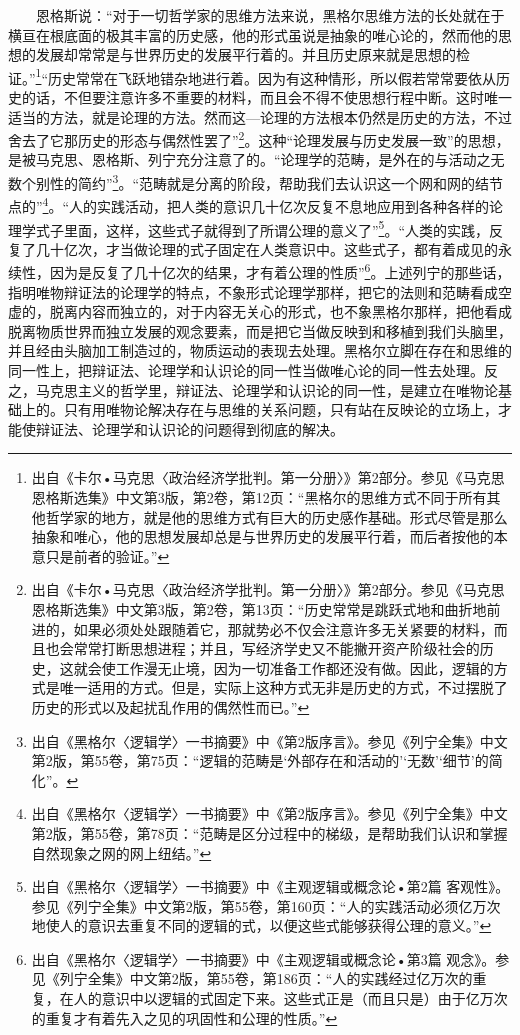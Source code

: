 \documentclass[cn,11pt,chinese]{elegantbook}
\begin{document}
　　恩格斯说：“对于一切哲学家的思维方法来说，黑格尔思维方法的长处就在于横亘在根底面的极其丰富的历史感，他的形式虽说是抽象的唯心论的，然而他的思想的发展却常常是与世界历史的发展平行着的。并且历史原来就是思想的检证。”\footnote[6]{ 出自《卡尔•马克思〈政治经济学批判。第一分册〉》第2部分。参见《马克思恩格斯选集》中文第3版，第2卷，第12页：“黑格尔的思维方式不同于所有其他哲学家的地方，就是他的思维方式有巨大的历史感作基础。形式尽管是那么抽象和唯心，他的思想发展却总是与世界历史的发展平行着，而后者按他的本意只是前者的验证。”}“历史常常在飞跃地错杂地进行着。因为有这种情形，所以假若常常要依从历史的话，不但要注意许多不重要的材料，而且会不得不使思想行程中断。这时唯一适当的方法，就是论理的方法。然而这—论理的方法根本仍然是历史的方法，不过舍去了它那历史的形态与偶然性罢了”\footnote[7]{ 出自《卡尔•马克思〈政治经济学批判。第一分册〉》第2部分。参见《马克思恩格斯选集》中文第3版，第2卷，第13页：“历史常常是跳跃式地和曲折地前进的，如果必须处处跟随着它，那就势必不仅会注意许多无关紧要的材料，而且也会常常打断思想进程；并且，写经济学史又不能撇开资产阶级社会的历史，这就会使工作漫无止境，因为一切准备工作都还没有做。因此，逻辑的方式是唯一适用的方式。但是，实际上这种方式无非是历史的方式，不过摆脱了历史的形式以及起扰乱作用的偶然性而已。”}。这种“论理发展与历史发展一致”的思想，是被马克思、恩格斯、列宁充分注意了的。“论理学的范畴，是外在的与活动之无数个别性的简约”\footnote[8]{ 出自《黑格尔〈逻辑学〉一书摘要》中《第2版序言》。参见《列宁全集》中文第2版，第55卷，第75页：“逻辑的范畴是‘外部存在和活动的’‘无数’‘细节’的简化”。}。“范畴就是分离的阶段，帮助我们去认识这一个网和网的结节点的”\footnote[9]{ 出自《黑格尔〈逻辑学〉一书摘要》中《第2版序言》。参见《列宁全集》中文第2版，第55卷，第78页：“范畴是区分过程中的梯级，是帮助我们认识和掌握自然现象之网的网上纽结。”}。“人的实践活动，把人类的意识几十亿次反复不息地应用到各种各样的论理学式子里面，这样，这些式子就得到了所谓公理的意义了”\footnote[10]{ 出自《黑格尔〈逻辑学〉一书摘要》中《主观逻辑或概念论•第2篇 客观性》。参见《列宁全集》中文第2版，第55卷，第160页：“人的实践活动必须亿万次地使人的意识去重复不同的逻辑的式，以便这些式能够获得公理的意义。”}。“人类的实践，反复了几十亿次，才当做论理的式子固定在人类意识中。这些式子，都有着成见的永续性，因为是反复了几十亿次的结果，才有着公理的性质”\footnote[11]{ 出自《黑格尔〈逻辑学〉一书摘要》中《主观逻辑或概念论•第3篇 观念》。参见《列宁全集》中文第2版，第55卷，第186页：“人的实践经过亿万次的重复，在人的意识中以逻辑的式固定下来。这些式正是（而且只是）由于亿万次的重复才有着先入之见的巩固性和公理的性质。”}。上述列宁的那些话，指明唯物辩证法的论理学的特点，不象形式论理学那样，把它的法则和范畴看成空虚的，脱离内容而独立的，对于内容无关心的形式，也不象黑格尔那样，把他看成脱离物质世界而独立发展的观念要素，而是把它当做反映到和移植到我们头脑里，并且经由头脑加工制造过的，物质运动的表现去处理。黑格尔立脚在存在和思维的同一性上，把辩证法、论理学和认识论的同一性当做唯心论的同一性去处理。反之，马克思主义的哲学里，辩证法、论理学和认识论的同一性，是建立在唯物论基础上的。只有用唯物论解决存在与思维的关系问题，只有站在反映论的立场上，才能使辩证法、论理学和认识论的问题得到彻底的解决。\\
\end{document}
